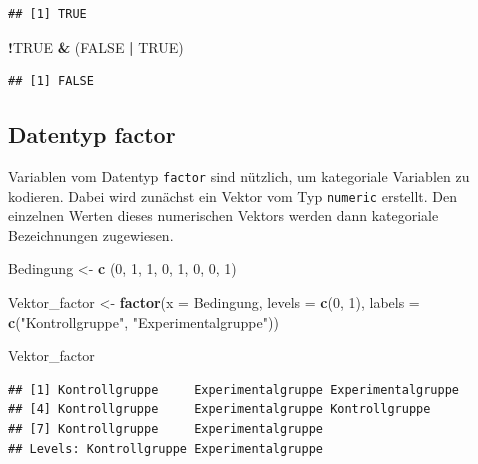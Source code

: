 \documentclass[
  ngerman,
]{book}
\newenvironment{Shaded}{\begin{snugshade}}{\end{snugshade}}
\newcommand{\AttributeTok}[1]{\textcolor[rgb]{0.13,0.29,0.53}{#1}}
\newcommand{\ConstantTok}[1]{\textcolor[rgb]{0.56,0.35,0.01}{#1}}
\newcommand{\DecValTok}[1]{\textcolor[rgb]{0.00,0.00,0.81}{#1}}
\newcommand{\FunctionTok}[1]{\textcolor[rgb]{0.13,0.29,0.53}{\textbf{#1}}}
\newcommand{\NormalTok}[1]{#1}
\newcommand{\OtherTok}[1]{\textcolor[rgb]{0.56,0.35,0.01}{#1}}
\newcommand{\SpecialCharTok}[1]{\textcolor[rgb]{0.81,0.36,0.00}{\textbf{#1}}}
\newcommand{\StringTok}[1]{\textcolor[rgb]{0.31,0.60,0.02}{#1}}
\begin{document}
\begin{verbatim}
## [1] TRUE
\end{verbatim}

\begin{Shaded}
\begin{Highlighting}[]
\SpecialCharTok{!}\ConstantTok{TRUE} \SpecialCharTok{\&}\NormalTok{ (}\ConstantTok{FALSE} \SpecialCharTok{|} \ConstantTok{TRUE}\NormalTok{)}
\end{Highlighting}
\end{Shaded}

\begin{verbatim}
## [1] FALSE
\end{verbatim}

\subsection{Datentyp factor}\label{datentyp-factor}

Variablen vom Datentyp \texttt{factor} sind nützlich, um kategoriale Variablen zu kodieren. Dabei wird zunächst ein Vektor vom Typ \texttt{numeric} erstellt. Den einzelnen Werten dieses numerischen Vektors werden dann kategoriale Bezeichnungen zugewiesen.

\begin{Shaded}
\begin{Highlighting}[]
\NormalTok{Bedingung }\OtherTok{\textless{}{-}} \FunctionTok{c}\NormalTok{ (}\DecValTok{0}\NormalTok{, }\DecValTok{1}\NormalTok{, }\DecValTok{1}\NormalTok{, }\DecValTok{0}\NormalTok{, }\DecValTok{1}\NormalTok{, }\DecValTok{0}\NormalTok{, }\DecValTok{0}\NormalTok{, }\DecValTok{1}\NormalTok{)}

\NormalTok{Vektor\_factor }\OtherTok{\textless{}{-}} \FunctionTok{factor}\NormalTok{(}\AttributeTok{x =}\NormalTok{ Bedingung, }
                        \AttributeTok{levels =} \FunctionTok{c}\NormalTok{(}\DecValTok{0}\NormalTok{, }\DecValTok{1}\NormalTok{),}
                        \AttributeTok{labels =} \FunctionTok{c}\NormalTok{(}\StringTok{"Kontrollgruppe"}\NormalTok{, }\StringTok{"Experimentalgruppe"}\NormalTok{))}

\NormalTok{Vektor\_factor}
\end{Highlighting}
\end{Shaded}

\begin{verbatim}
## [1] Kontrollgruppe     Experimentalgruppe Experimentalgruppe
## [4] Kontrollgruppe     Experimentalgruppe Kontrollgruppe    
## [7] Kontrollgruppe     Experimentalgruppe
## Levels: Kontrollgruppe Experimentalgruppe
\end{verbatim}
\end{document}
